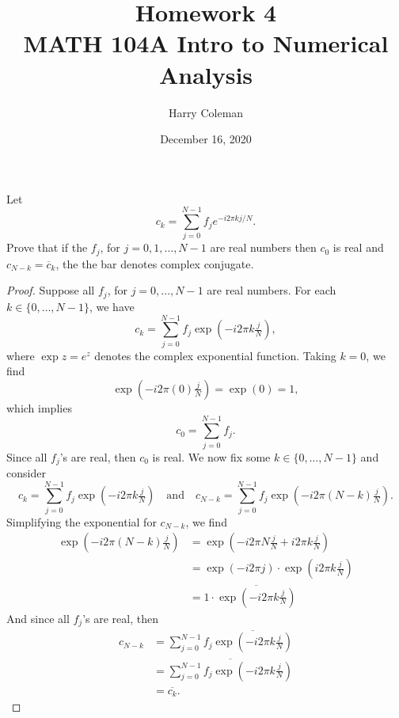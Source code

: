 \documentclass[12pt]{article}
\newenvironment{problem}
    {\begin{lrbox}{\mybox}\begin{minipage}{0.98\textwidth}}
    {\end{minipage}\end{lrbox}\framebox[\textwidth]{\usebox{\mybox}}}
\newcommand{\isp}[1]{\quad\text{#1}\quad}
\newcommand{\<}{\left\langle}
\renewcommand{\>}{\right\rangle}
\newcommand{\conj}[1]{\overline{#1}}
\newcommand{\expp}[1]{\exp\!\left( #1 \right)}
\begin{document}
 
\title{Homework 4\\
    \large MATH 104A Intro to Numerical Analysis
}
\author{Harry Coleman}
\date{December 16, 2020}
\maketitle

\section{}
\begin{problem}
    Let
    \[
        c_k = \sum_{j=0}^{N-1} f_j e^{-i2\pi kj/N}.
    \]
    Prove that if the $f_j$, for $j = 0, 1, \dots, N-1$ are real numbers then $c_0$ is real and $c_{N - k} = \conj{c}_k$, the the bar denotes complex conjugate.
\end{problem}

\begin{proof}
    Suppose all $f_j$, for $j = 0, \dots, N-1$ are real numbers. For each $k \in \{0, \dots, N-1\}$, we have
    \[
        c_k = \sum_{j=0}^{N-1} f_j \expp{-i2\pi k \tfrac{j}{N}},
    \]
    where $\exp z = e^z$ denotes the complex exponential function. Taking $k = 0$, we find
    \[
        \expp{-i2\pi (0) \tfrac{j}{N}} = \expp{0} = 1,
    \]
    which implies
    \[
        c_0 = \sum_{j=0}^{N-1} f_j.
    \]
    Since all $f_j$'s are real, then $c_0$ is real. We now fix some $k \in \{0, \dots, N-1\}$ and consider
    \[
        c_k = \sum_{j=0}^{N-1} f_j \expp{-i2\pi k \tfrac{j}{N}} 
        \isp{and} 
        c_{N-k} = \sum_{j=0}^{N-1} f_j \expp{-i2\pi (N - k) \tfrac{j}{N}}.
    \]
    Simplifying the exponential for $c_{N-k}$, we find
    \begin{align*}
        \expp{-i2\pi (N - k) \tfrac{j}{N}}
            &= \expp{-i2\pi N \tfrac{j}{N} + i2\pi k \tfrac{j}{N}} \\
            &= \expp{-i2\pi j} \cdot \expp{i2\pi k \tfrac{j}{N}} \\
            &= 1 \cdot \conj{\expp{-i2\pi k \tfrac{j}{N}}}
    \end{align*}
    And since all $f_j$'s are real, then
    \begin{align*}
        c_{N-k}
            &= \sum_{j=0}^{N-1} f_j \conj{\expp{-i2\pi k \tfrac{j}{N}}} \\
            &= \conj{ \sum_{j=0}^{N-1} f_j \expp{-i2\pi k \tfrac{j}{N}} } \\
            &= \conj{c_k}.
    \end{align*}
    
\end{proof}
\end{document}
